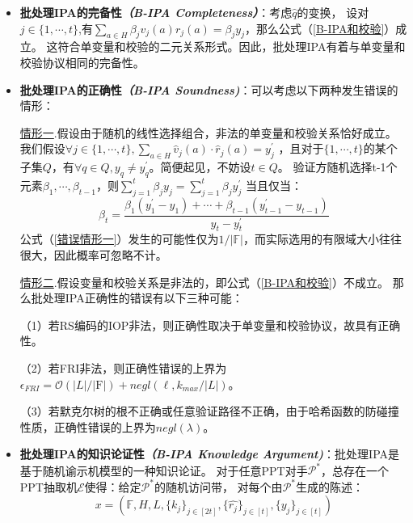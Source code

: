 \documentclass[zihao=-4]{ctexart}
\begin{document}
\begin{itemize}
  \item \textbf{批处理IPA的完备性\emph{（B-IPA Completeness）}}：考虑$\hat{q}$的变换，
        设对$j \in\{1,\cdots,t\}$,有$\sum_{a\in H}\beta_jv_j(a)r_j(a)=\beta_jy_j$，那么公式（\ref{B-IPA和校验}）成立。
        这符合单变量和校验的二元关系形式。因此，批处理IPA有着与单变量和校验协议相同的完备性。
  \item \textbf{批处理IPA的正确性\emph{（B-IPA Soundness)}}：可以考虑以下两种发生错误的情形：\par
        \underline{情形一}.假设由于随机的线性选择组合，非法的单变量和校验关系恰好成立。
        我们假设$\forall j \in\{1,\cdots,t\},\sum_{a\in H}\hat{v}_j(a)\cdot\hat{r}_j(a)=y_j^{\prime}$
        ，且对于$\{1,\cdots,t\}$的某个子集$Q$，有$\forall q \in Q,y_q\neq y_q^{\prime}$。简便起见，不妨设$t\in Q$。
        验证方随机选择t-1个元素$\beta_1,\cdots,\beta_{t-1}$，则$\sum_{j=1}^t\beta_jy_j=\sum_{j=1}^t\beta_jy_j^{\prime}$
        当且仅当：
        \begin{equation}\beta_t=\dfrac{\beta_1(y_1^{\prime}-y_1)+\cdots+\beta_{t-1}(y_{t-1}^{\prime}-y_{t-1})}{y_t-y_t^{\prime}} \label{错误情形一}\end{equation}
        公式（\ref{错误情形一}）发生的可能性仅为$1/|\mathbb{F}|$，而实际选用的有限域大小往往很大，因此概率可忽略不计。\par
        \underline{情形二}.假设变量和校验关系是非法的，即公式（\ref{B-IPA和校验}）不成立。
          那么批处理IPA正确性的错误有以下三种可能：\par
        （1）若RS编码的IOP非法，则正确性取决于单变量和校验协议，故具有正确性。\par
        （2）若FRI非法，则正确性错误的上界为$\epsilon_{FRI}=\mathcal{O}(|L|/|\mathrm{F}|)+negl(\ell,k_{max}/|L|)$。\par
        （3）若默克尔树的根不正确或任意验证路径不正确，由于哈希函数的防碰撞性质，正确性错误的上界为$negl(\lambda)$。
  \item \textbf{批处理IPA的知识论证性\emph{（B-IPA Knowledge Argument)}}：批处理IPA是基于随机谕示机模型的一种知识论证。
        对于任意PPT对手$\mathcal{P}^\ast$，总存在一个PPT抽取机$\mathcal{E}$使得：给定$\mathcal{P}^\ast$的随机访问带，
        对每个由$\mathcal{P}^\ast$生成的陈述：
        \begin{equation}
          x=(\mathbb{F},H,L,\{k_j\}_{j\in [2t]},\{\hat{r_j}\}_{j\in [t]},\{y_j\}_{j \in [t]})
        \end{equation}\par

\end{itemize}
\end{document}
